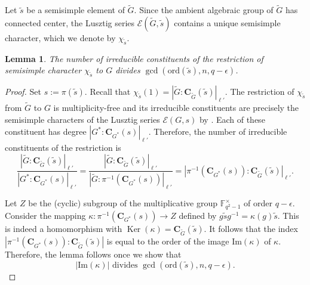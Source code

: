 \documentclass[12pt]{amsart}
\newtheorem{lemma}[theorem]{Lemma}
\theoremstyle{definition}
\numberwithin{equation}{section}
\newcommand{\Ker}{\operatorname{Ker}}
\newcommand{\ord}{{\mathrm {ord}}}
\renewcommand{\Im}{{\mathrm {Im}}}
\newcommand{\FF}{{\mathbb F}}
\newcommand{\EC}{\mathcal{E}}
\newcommand{\bC}{{\mathbf{C}}}
\begin{document}
Let $\widetilde{s}$ be a semisimple element of $\widetilde{G}$.
Since the ambient algebraic group of $\widetilde{G}$ has connected
center, the Lusztig series
$\mathcal{E}(\widetilde{G},\widetilde{s})$ contains a unique
semisimple character, which we denote by $\chi_{\widetilde{s}}$.

\begin{lemma}\label{lem:numberofconstituents}
The number of irreducible constituents of the restriction of
semisimple character $\chi_{\widetilde{s}}$ to $G$ divides
$\gcd(\ord(\widetilde{s}),n,q-\epsilon)$.
\end{lemma}

\begin{proof}
Set $s:=\pi(\widetilde{s})$. Recall that
$\chi_{\widetilde{s}}(1)=|\widetilde{G}:\bC_{\widetilde{G}}(\widetilde{s})|_{\ell'}$.
The restriction of $\chi_{\widetilde{s}}$ from $\widetilde{G}$ to
$G$ is multiplicity-free and its irreducible constituents are
precisely the semisimple characters of the Lusztig series
\(\EC(G,s)\) by \cite[Corollary~2.6.18]{GeckMalle}. Each of these
constituent has degree $|G^* : \bC_{G^*}(s)|_{\ell'}$. Therefore,
the number of irreducible constituents of the restriction is
\[
\frac{|\widetilde{G}:\bC_{\widetilde{G}}(\widetilde{s})|_{\ell'}}{|G^*
:
\bC_{G^*}(s)|_{\ell'}}=\frac{|\widetilde{G}:\bC_{\widetilde{G}}(\widetilde{s})|_{\ell'}}{|\widetilde{G}
:
\pi^{-1}(\bC_{G^*}(s))|_{\ell'}}=|\pi^{-1}(\bC_{G^*}(s)):\bC_{\widetilde{G}}(\widetilde{s})|_{\ell'}.
\]




Let $Z$ be the (cyclic) subgroup of the multiplicative group
$\FF_{q^2-1}^\times$ of order $q-\epsilon$. Consider the mapping
$\kappa: \pi^{-1}(\bC_{G^*}(s))\to Z$ defined by
$g\widetilde{s}g^{-1}=\kappa(g)\widetilde{s}$. This is indeed a
homomorphism with $\Ker(\kappa)=\bC_{\widetilde{G}}(\widetilde{s})$.
It follows that the index
$|\pi^{-1}(\bC_{G^*}(s)):\bC_{\widetilde{G}}(\widetilde{s})|$ is
equal to the order of the image $\Im(\kappa)$ of $\kappa$.
Therefore, the lemma follows once we show that
\[
|\Im(\kappa)| \text{ divides }
\gcd(\ord(\widetilde{s}),n,q-\epsilon).
\]



\end{proof}
\end{document}
